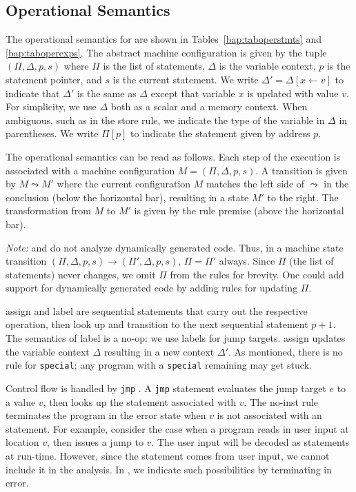 \subsection{Operational Semantics}
\label{vine:operational}



The operational semantics for \bil are shown in
Tables~\ref{bap:taboperstmts} and \ref{bap:taboperexps}.  The abstract
machine configuration is given by the tuple $(\Pi, \Delta, p, s)$
where $\Pi$ is the list of statements, $\Delta$ is the variable
context, $p$ is the statement pointer, and $s$ is the current
statement.  We write $\Delta' = \Delta[x \leftarrow v]$ to indicate
that $\Delta'$ is the same as $\Delta$ except that variable $x$ is
updated with value $v$.  For simplicity, we use $\Delta$ both as a
scalar and a memory context. When ambiguous, such as in the {\sc
  store} rule, we indicate the type of the variable in $\Delta$ in
parentheses. We write $\Pi[p]$ to indicate the statement given by
address $p$.

The operational semantics can be read as follows.  Each step of the
execution is associated with a machine configuration $M = (\Pi,
\Delta, p, s)$.  A transition is given by $M \leadsto M'$ where the
current configuration $M$ matches the left side of $\leadsto$ in the
conclusion (below the horizontal bar), resulting in a state $M'$ to
the right.  The transformation from $M$ to $M'$ is given by the rule
premise (above the horizontal bar). 

{\it Note:} \bap and \bil do not analyze dynamically generated
code. Thus, in a machine state transition $(\Pi, \Delta, p, s)
\rightarrow (\Pi', \Delta, p, s)$, $\Pi = \Pi'$ always. Since $\Pi$
(the list of statements) never changes, we omit $\Pi$ from the rules
for brevity. One could add support for dynamically generated code by
adding rules for updating $\Pi$. 


{\sc assign} and {\sc label} are sequential statements that carry
out the respective operation, then look up and transition to the next
sequential statement $p+1$. The semantics of {\sc label} is a no-op:
we use labels for jump targets.  {\sc assign} updates the variable
context $\Delta$ resulting in a new context $\Delta'$.  As mentioned,
there is no rule for {\tt special}; any program with a {\tt special}
remaining may get stuck.

Control flow is handled by {\tt jmp}%
. A {\tt jmp} statement
evaluates the jump target $e$ to a value $v$, then looks up the
statement associated with $v$.  The {\sc no-inst} rule terminates
the program in the error state when $v$ is not associated with an
statement. For example, consider the case when a program reads in
user input at location $v$, then issues a jump to $v$.  The user input
will be decoded as statements at run-time.  However, since the
statement comes from user input, we cannot include it in the analysis. In
\bap, we indicate such possibilities by terminating in error.




%

